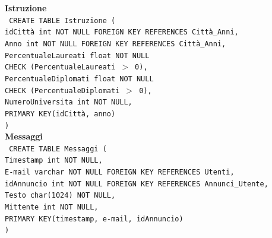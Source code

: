 \documentclass[a4paper,12pt]{report}
\begin{document}
                \noindent
                {\large \textbf{Istruzione}} \\
                \texttt{
                    CREATE TABLE Istruzione ( \\
                    \null\quad\quad idCittà                 int         NOT NULL FOREIGN KEY REFERENCES Città\_Anni, \\
                    \null\quad\quad Anno                    int         NOT NULL FOREIGN KEY REFERENCES Città\_Anni, \\
                    \null\quad\quad PercentualeLaureati     float       NOT NULL \\
                            \null\qquad\qquad CHECK (PercentualeLaureati $>$ 0), \\
                    \null\quad\quad PercentualeDiplomati    float       NOT NULL \\
                            \null\qquad\qquad CHECK (PercentualeDiplomati $>$ 0), \\
                    \null\quad\quad NumeroUniversita        int         NOT NULL, \\
                    \null\quad\quad PRIMARY KEY(idCittà, anno) \\
                    )
                } \\

                \noindent
                {\large \textbf{Messaggi}} \\
                \texttt{
                    CREATE TABLE Messaggi ( \\
                    \null\quad\quad Timestamp   int         NOT NULL, \\
                    \null\quad\quad E-mail      varchar     NOT NULL FOREIGN KEY REFERENCES Utenti, \\
                    \null\quad\quad idAnnuncio  int         NOT NULL FOREIGN KEY REFERENCES Annunci\_Utente, \\
                    \null\quad\quad Testo       char(1024)  NOT NULL, \\
                    \null\quad\quad Mittente    int         NOT NULL, \\
                    \null\quad\quad PRIMARY KEY(timestamp, e-mail, idAnnuncio) \\
                    )
                } \\
\end{document}
